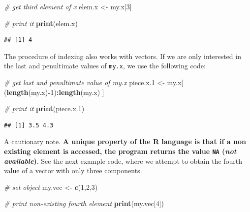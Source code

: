 \documentclass[11pt,]{book}
\newenvironment{Shaded}{\begin{snugshade}}{\end{snugshade}}
\newcommand{\KeywordTok}[1]{\textcolor[rgb]{0.27,0.27,0.27}{\textbf{#1}}}
\newcommand{\DecValTok}[1]{\textcolor[rgb]{0.06,0.06,0.06}{#1}}
\newcommand{\StringTok}[1]{\textcolor[rgb]{0.5,0.5,0.5}{#1}}
\newcommand{\CommentTok}[1]{\textcolor[rgb]{0.56,0.35,0.01}{\textit{#1}}}
\newcommand{\OperatorTok}[1]{\textcolor[rgb]{0.81,0.36,0.00}{\textbf{#1}}}
\newcommand{\NormalTok}[1]{#1}
\begin{document}
\begin{Shaded}
\begin{Highlighting}[]
\CommentTok{# get third element of x}
\NormalTok{elem.x <-}\StringTok{ }\NormalTok{my.x[}\DecValTok{3}\NormalTok{]}

\CommentTok{# print it}
\KeywordTok{print}\NormalTok{(elem.x)}
\end{Highlighting}
\end{Shaded}

\begin{verbatim}
## [1] 4
\end{verbatim}

The procedure of indexing also works with vectors. If we are only
interested in the last and penultimate values of \texttt{my.x}, we use
the following code:

\begin{Shaded}
\begin{Highlighting}[]
\CommentTok{# get last and penultimate value of my.x}
\NormalTok{piece.x.}\DecValTok{1}\NormalTok{ <-}\StringTok{ }\NormalTok{my.x[ (}\KeywordTok{length}\NormalTok{(my.x)}\OperatorTok{-}\DecValTok{1}\NormalTok{)}\OperatorTok{:}\KeywordTok{length}\NormalTok{(my.x) ]}

\CommentTok{# print it}
\KeywordTok{print}\NormalTok{(piece.x.}\DecValTok{1}\NormalTok{)}
\end{Highlighting}
\end{Shaded}

\begin{verbatim}
## [1] 3.5 4.3
\end{verbatim}

A cautionary note. \textbf{A unique property of the R language is that
if a non existing element is accessed, the program returns the value
\texttt{NA} (\emph{not available})}. See the next example code, where we
attempt to obtain the fourth value of a vector with only three
components.

\begin{Shaded}
\begin{Highlighting}[]
\CommentTok{# set object}
\NormalTok{my.vec <-}\StringTok{ }\KeywordTok{c}\NormalTok{(}\DecValTok{1}\NormalTok{,}\DecValTok{2}\NormalTok{,}\DecValTok{3}\NormalTok{)}

\CommentTok{# print non-existing fourth element}
\KeywordTok{print}\NormalTok{(my.vec[}\DecValTok{4}\NormalTok{])}
\end{Highlighting}
\end{Shaded}
\end{document}
